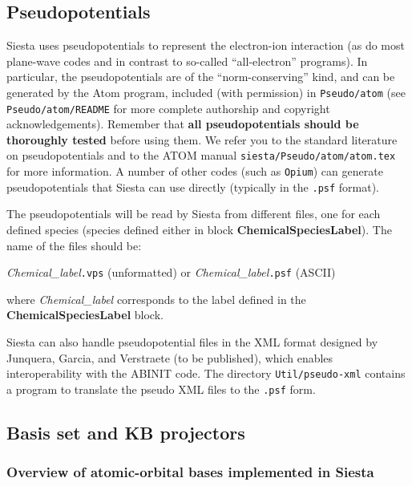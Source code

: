 \documentclass[11pt]{article}
\begin{document}
\vspace{5pt}
\subsection{Pseudopotentials}

{\sc Siesta} uses pseudopotentials to represent the electron-ion
interaction (as do most plane-wave codes and in contrast to so-called
``all-electron'' programs). In particular, the pseudopotentials are of
the ``norm-conserving'' kind, and can be generated by the {\sc Atom} program,
included (with permission) in {\tt Pseudo/atom} (see {\tt
  Pseudo/atom/README} for more complete authorship and
copyright acknowledgements). Remember that {\bf all pseudopotentials
  should be thoroughly tested} before using them. We refer you to the
standard literature on pseudopotentials and to the {\sc ATOM} manual
{\tt siesta/Pseudo/atom/atom.tex} for more information. A number of
other codes (such as {\tt Opium}) can generate pseudopotentials that
{\sc Siesta} can use directly (typically in the {\tt .psf} format).

The pseudopotentials will be read by {\sc Siesta} from different files, one
for each defined species (species defined either in block
{\bf ChemicalSpeciesLabel}).
The name of the files should be:

{\it Chemical\_label}{\tt .vps} (unformatted) or
{\it Chemical\_label}{\tt .psf} (ASCII)

\noindent
where {\it Chemical\_label} corresponds to the label defined in the
{\bf ChemicalSpeciesLabel} block.

Siesta can also handle pseudopotential files in the XML format
designed by Junquera, Garcia, and Verstraete (to be published), which
enables interoperability with the ABINIT code. The directory
{\tt Util/pseudo-xml} contains a program to translate the pseudo
XML files to the {\tt .psf} form.


\vspace{5pt}
\subsection{Basis set and KB projectors}

\subsubsection{Overview of atomic-orbital bases implemented in {\sc Siesta}}
\end{document}
